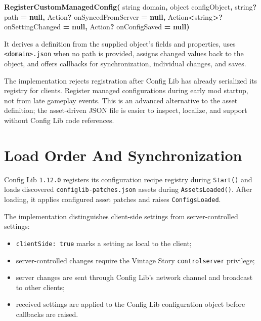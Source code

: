 \documentclass[
  11pt,
  letterpaper,
  titlepage]{article}
\newenvironment{Shaded}{\begin{snugshade}}{\end{snugshade}}
\newcommand{\DataTypeTok}[1]{\textcolor[rgb]{0.13,0.29,0.53}{#1}}
\newcommand{\FunctionTok}[1]{\textcolor[rgb]{0.13,0.29,0.53}{\textbf{#1}}}
\newcommand{\KeywordTok}[1]{\textcolor[rgb]{0.13,0.29,0.53}{\textbf{#1}}}
\newcommand{\NormalTok}[1]{#1}
\newcommand{\OperatorTok}[1]{\textcolor[rgb]{0.81,0.36,0.00}{\textbf{#1}}}
\providecommand{\tightlist}{%
  \setlength{\itemsep}{0pt}\setlength{\parskip}{0pt}}
\begin{document}
\begin{Shaded}
\begin{Highlighting}[]
\FunctionTok{RegisterCustomManagedConfig}\OperatorTok{(}
    \DataTypeTok{string}\NormalTok{ domain}\OperatorTok{,}
    \DataTypeTok{object}\NormalTok{ configObject}\OperatorTok{,}
    \DataTypeTok{string}\OperatorTok{?}\NormalTok{ path }\OperatorTok{=} \KeywordTok{null}\OperatorTok{,}
\NormalTok{    Action}\OperatorTok{?}\NormalTok{ onSyncedFromServer }\OperatorTok{=} \KeywordTok{null}\OperatorTok{,}
\NormalTok{    Action}\OperatorTok{\textless{}}\DataTypeTok{string}\OperatorTok{\textgreater{}?}\NormalTok{ onSettingChanged }\OperatorTok{=} \KeywordTok{null}\OperatorTok{,}
\NormalTok{    Action}\OperatorTok{?}\NormalTok{ onConfigSaved }\OperatorTok{=} \KeywordTok{null}\OperatorTok{)}
\end{Highlighting}
\end{Shaded}

It derives a definition from the supplied object's fields and
properties, uses \texttt{\textless{}domain\textgreater{}.json} when no
path is provided, assigns changed values back to the object, and offers
callbacks for synchronization, individual changes, and saves.

The implementation rejects registration after Config Lib has already
serialized its registry for clients. Register managed configurations
during early mod startup, not from late gameplay events. This is an
advanced alternative to the asset definition; the asset-driven JSON file
is easier to inspect, localize, and support without Config Lib code
references.

\section{Load Order And
Synchronization}\label{load-order-and-synchronization}

Config Lib \texttt{1.12.0} registers its configuration recipe registry
during \texttt{Start()} and loads discovered
\texttt{configlib-patches.json} assets during \texttt{AssetsLoaded()}.
After loading, it applies configured asset patches and raises
\texttt{ConfigsLoaded}.

The implementation distinguishes client-side settings from
server-controlled settings:

\begin{itemize}
\tightlist
\item
  \texttt{clientSide:\ true} marks a setting as local to the client;
\item
  server-controlled changes require the Vintage Story
  \texttt{controlserver} privilege;
\item
  server changes are sent through Config Lib's network channel and
  broadcast to other clients;
\item
  received settings are applied to the Config Lib configuration object
  before callbacks are raised.
\end{itemize}
\end{document}
